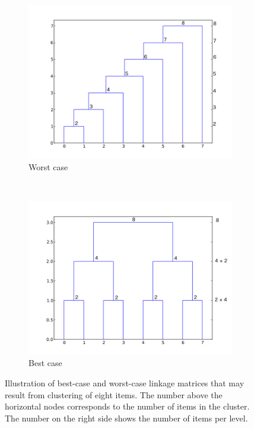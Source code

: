 \documentclass[parskip]{cs4rep}
\begin{document}
\begin{figure}[t,b]
   \centering
   \begin{subfigure}[b]{0.45\textwidth}
       \centering
       \includegraphics[width=\textwidth]{figures/implementation/worst_case_linkage.png}
       \caption{Worst case}
       \label{fig:implementation:dendrogram:worst}
   \end{subfigure}
   ~
   \begin{subfigure}[b]{0.45\textwidth}
       \centering
       \includegraphics[width=\textwidth]{figures/implementation/perfect_linkage.png}
       \caption{Best case}
       \label{fig:implementation:dendrogram:best}
   \end{subfigure}
   \label{fig:implementation:dendrogram}
   \caption{Illustration of best-case and worst-case linkage matrices that may result from clustering of eight items. The number above the horizontal nodes corresponds to the number of items in the cluster. The number on the right side shows the number of items per level.}
\end{figure}
\end{document}
